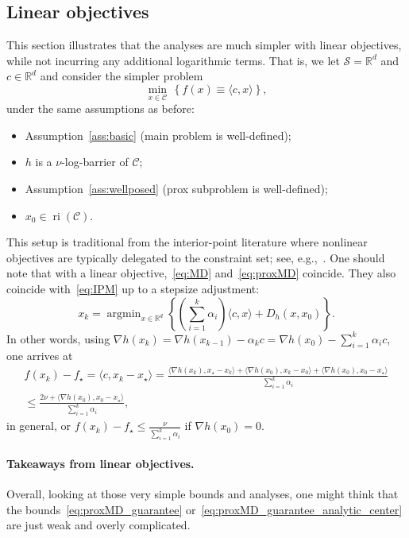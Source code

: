 \documentclass[a4paper]{article}
\renewcommand{\leq}{\leqslant}
\newcommand{\CC}{\mathcal{C}}
\renewcommand{\SS}{\mathcal{S}}
\newcommand{\R}{\mathbb{R}}
\newcommand{\ip}[2]{\langle #1, #2\rangle}
\DeclareMathOperator*{\argmin}{argmin}
\DeclareMathOperator{\ri}{ri}
\begin{document}
\subsection{Linear objectives}\label{sec:linear}

This section illustrates that the analyses are much simpler with linear objectives, while not incurring any additional logarithmic terms.
That is, we let $\SS=\R^d$ and $c\in\R^d$ and consider the simpler problem 
\[
        \min_{x\in\CC}\,\left\{ f(x)\equiv \ip{c}{x}\right\},
\]
under the same assumptions as before:
\begin{itemize}
        \item Assumption~\ref{ass:basic} (main problem is well-defined);
        \item $h$ is a $\nu$-log-barrier of $\CC$;
        \item Assumption~\ref{ass:wellposed} (prox subproblem is well-defined);
        \item $x_0\in \ri(\CC)$.
\end{itemize}
This setup is traditional from the interior-point literature where nonlinear objectives are typically delegated to the constraint set; see, e.g.,~\cite[Section 5.3.4]{nesterov2018lectures}.
One should note that with a linear objective,~\eqref{eq:MD} and~\eqref{eq:proxMD} coincide. They also coincide with~\eqref{eq:IPM} up to a stepsize adjustment:
\[ 
        x_{k} = \argmin_{x\in\R^d}\left\{ \left(\sum_{i=1}^k\alpha_i\right)\ip{c}{x} + D_h(x,x_0)\right\}.
\]
In other words, using $\nabla h(x_k)=\nabla h(x_{k-1})-\alpha_k c=\nabla h(x_0)-\sum_{i=1}^{k}\alpha_i c$, one arrives at
\begin{multline*}
        f(x_k)-f_\star
        =
        \ip{c}{x_k-x_\star}
        =
        \frac{\ip{\nabla h(x_k)}{ x_\star-x_k}+\ip{\nabla h(x_0)}{x_k-x_0}+\ip{\nabla h(x_0)}{x_0-x_\star}}{\sum_{i=1}^{k}\alpha_i}
        \\
        \leq
        \frac{2\nu+\ip{\nabla h(x_0)}{x_0-x_\star}}{\sum_{i=1}^{k}\alpha_i},
\end{multline*}
in general, or $f(x_k)-f_\star\leq \tfrac{\nu}{\sum_{i=1}^{k}\alpha_i}$ if $\nabla h(x_0)=0$.

\paragraph{Takeaways from linear objectives.}
Overall, looking at those very simple bounds and analyses, one might think that the bounds~\eqref{eq:proxMD_guarantee} or~\eqref{eq:proxMD_guarantee_analytic_center} are just weak and overly complicated.
\end{document}

